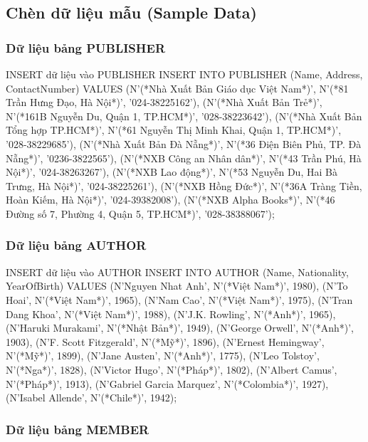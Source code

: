 \documentclass[12pt,a4paper]{article}
\begin{document}
\subsection{Chèn dữ liệu mẫu (Sample Data)}

\subsubsection{Dữ liệu bảng PUBLISHER}

\begin{sqlcode}{INSERT dữ liệu vào PUBLISHER}
INSERT INTO PUBLISHER (Name, Address, ContactNumber) VALUES
(N'(*Nhà Xuất Bản Giáo dục Việt Nam*)', N'(*81 Trần Hưng Đạo, Hà Nội*)', '024-38225162'),
(N'(*Nhà Xuất Bản Trẻ*)', N'(*161B Nguyễn Du, Quận 1, TP.HCM*)', '028-38223642'),
(N'(*Nhà Xuất Bản Tổng hợp TP.HCM*)', N'(*61 Nguyễn Thị Minh Khai, Quận 1, TP.HCM*)', '028-38229685'),
(N'(*Nhà Xuất Bản Đà Nẵng*)', N'(*36 Điện Biên Phủ, TP. Đà Nẵng*)', '0236-3822565'),
(N'(*NXB Công an Nhân dân*)', N'(*43 Trần Phú, Hà Nội*)', '024-38263267'),
(N'(*NXB Lao động*)', N'(*53 Nguyễn Du, Hai Bà Trưng, Hà Nội*)', '024-38225261'),
(N'(*NXB Hồng Đức*)', N'(*36A Tràng Tiền, Hoàn Kiếm, Hà Nội*)', '024-39382008'),
(N'(*NXB Alpha Books*)', N'(*46 Đường số 7, Phường 4, Quận 5, TP.HCM*)', '028-38388067');
\end{sqlcode}

\subsubsection{Dữ liệu bảng AUTHOR}

\begin{sqlcode}{INSERT dữ liệu vào AUTHOR}
INSERT INTO AUTHOR (Name, Nationality, YearOfBirth) VALUES
(N'Nguyen Nhat Anh', N'(*Việt Nam*)', 1980),
(N'To Hoai', N'(*Việt Nam*)', 1965),
(N'Nam Cao', N'(*Việt Nam*)', 1975),
(N'Tran Dang Khoa', N'(*Việt Nam*)', 1988),
(N'J.K. Rowling', N'(*Anh*)', 1965),
(N'Haruki Murakami', N'(*Nhật Bản*)', 1949),
(N'George Orwell', N'(*Anh*)', 1903),
(N'F. Scott Fitzgerald', N'(*Mỹ*)', 1896),
(N'Ernest Hemingway', N'(*Mỹ*)', 1899),
(N'Jane Austen', N'(*Anh*)', 1775),
(N'Leo Tolstoy', N'(*Nga*)', 1828),
(N'Victor Hugo', N'(*Pháp*)', 1802),
(N'Albert Camus', N'(*Pháp*)', 1913),
(N'Gabriel Garcia Marquez', N'(*Colombia*)', 1927),
(N'Isabel Allende', N'(*Chile*)', 1942);
\end{sqlcode}

\subsubsection{Dữ liệu bảng MEMBER}
\end{document}

